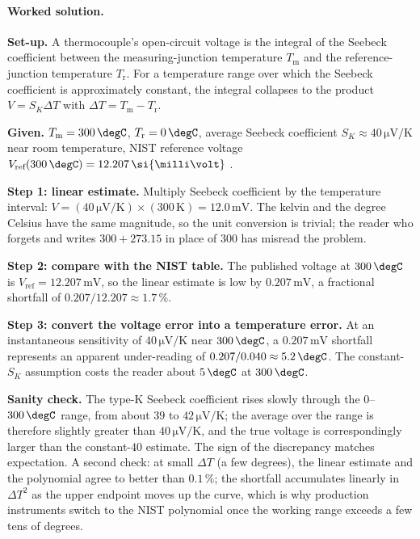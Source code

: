\paragraph{Worked solution.}
\textbf{Set-up.} A thermocouple's open-circuit voltage is the
integral of the Seebeck coefficient between the measuring-junction
temperature $T_{\text{m}}$ and the reference-junction temperature
$T_{\text{r}}$. For a temperature range over which the Seebeck
coefficient is approximately constant, the integral collapses to
the product $V = S_{K} \Delta T$ with $\Delta T = T_{\text{m}} -
T_{\text{r}}$.

\textbf{Given.} $T_{\text{m}} = 300 \,\degC$, $T_{\text{r}} = 0
\,\degC$, average Seebeck coefficient $S_{K} \approx 40 \,\si
{\micro\volt\per\kelvin}$ near room temperature, NIST reference
voltage $V_{\text{ref}}(300 \,\degC) = 12.207 \,\si{\milli\volt}$
\cite{web:ch05-nist-its90}.

\textbf{Step 1: linear estimate.} Multiply Seebeck coefficient by
the temperature interval: $V = (40 \,\si{\micro\volt\per\kelvin})
\times (300 \,\si{\kelvin}) = 12.0 \,\si{\milli\volt}$. The
kelvin and the degree Celsius have the same magnitude, so the
unit conversion is trivial; the reader who forgets and writes
$300 + 273.15$ in place of $300$ has misread the problem.

\textbf{Step 2: compare with the NIST table.} The published
voltage at $300 \,\degC$ is $V_{\text{ref}} = 12.207 \,\si{\milli
\volt}$, so the linear estimate is low by $0.207 \,\si{\milli
\volt}$, a fractional shortfall of $0.207 / 12.207 \approx 1.7\,\%$.

\textbf{Step 3: convert the voltage error into a temperature
error.} At an instantaneous sensitivity of $40 \,\si{\micro\volt
\per\kelvin}$ near $300 \,\degC$, a $0.207 \,\si{\milli\volt}$
shortfall represents an apparent under-reading of $0.207 / 0.040
\approx 5.2 \,\degC$. The constant-$S_{K}$ assumption costs the
reader about $5 \,\degC$ at $300 \,\degC$.

\textbf{Sanity check.} The type-K Seebeck coefficient rises slowly
through the $0$--$300 \,\degC$ range, from about $39$ to $42 \,\si
{\micro\volt\per\kelvin}$; the average over the range is therefore
slightly greater than $40 \,\si{\micro\volt\per\kelvin}$, and the
true voltage is correspondingly larger than the constant-$40$
estimate. The sign of the discrepancy matches expectation. A
second check: at small $\Delta T$ (a few degrees), the linear
estimate and the polynomial agree to better than $0.1\,\%$; the
shortfall accumulates linearly in $\Delta T^{2}$ as the upper
endpoint moves up the curve, which is why production instruments
switch to the NIST polynomial once the working range exceeds a
few tens of degrees.

